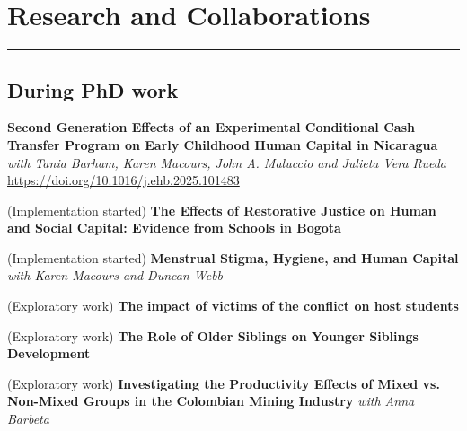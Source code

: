 \documentclass[letterpaper]{article}
\renewenvironment{itemize}{
  \begin{list}{}{
    \setlength{\leftmargin}{1.5em}
  }
}{
  \end{list}
}
\begin{document}
\newpage
\section*{\textbf{Research and Collaborations}}
\hrule
\subsection*{During PhD work}
\begin{itemize}
\item  \textbf{Second Generation Effects of an Experimental Conditional Cash Transfer Program on Early Childhood Human Capital in Nicaragua} \textit{with Tania Barham, Karen Macours, John A. Maluccio and Julieta Vera Rueda} \href{https://doi.org/10.1016/j.ehb.2025.101483}{https://doi.org/10.1016/j.ehb.2025.101483}
\item (Implementation started) \textbf{The Effects of Restorative Justice on Human and Social Capital: Evidence from Schools in Bogota}
\item (Implementation started) \textbf{Menstrual Stigma, Hygiene, and Human Capital} \textit{with Karen Macours and Duncan Webb}
\item (Exploratory work) \textbf{The impact of victims of the conflict on host students}
\item (Exploratory work) \textbf{The Role of Older Siblings on Younger Siblings Development} 
\item (Exploratory work) \textbf{Investigating the Productivity Effects of Mixed vs. Non-Mixed Groups in the Colombian Mining Industry} \textit{with Anna Barbeta}
\end{itemize}
\end{document}
